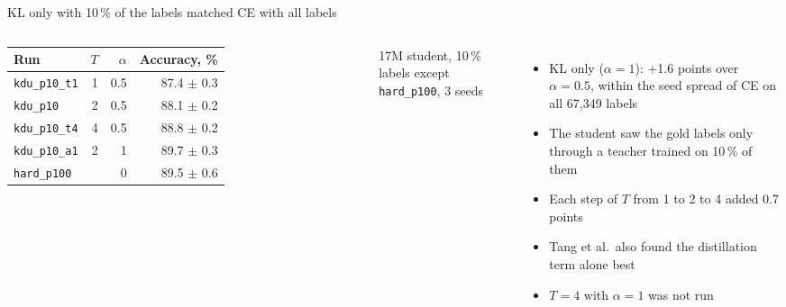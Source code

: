 \documentclass[aspectratio=169,11pt]{beamer}
\begin{document}
\begin{frame}{KL only with 10\,\% of the labels matched CE with all labels}
  \begin{columns}[T]
    \small
    \begin{tabular}{lrrr}
      \toprule
      Run & $T$ & $\alpha$ & Accuracy, \% \\
      \midrule
      \texttt{kdu\_p10\_t1} & 1 & 0.5 & 87.4 $\pm$ 0.3 \\
      \texttt{kdu\_p10} & 2 & 0.5 & 88.1 $\pm$ 0.2 \\
      \texttt{kdu\_p10\_t4} & 4 & 0.5 & 88.8 $\pm$ 0.2 \\
      \texttt{kdu\_p10\_a1} & 2 & 1 & 89.7 $\pm$ 0.3 \\
      \texttt{hard\_p100} & & 0 & 89.5 $\pm$ 0.6 \\
      \bottomrule
    \end{tabular}

    \footnotesize 17M student, 10\,\% labels except \texttt{hard\_p100}, 3 seeds
    \begin{itemize}
      \item KL only ($\alpha = 1$): +1.6 points over $\alpha = 0.5$, within the seed spread of CE on all 67,349 labels
      \item The student saw the gold labels only through a teacher trained on 10\,\% of them
      \item Each step of $T$ from 1 to 2 to 4 added 0.7 points
      \item Tang et al.\ also found the distillation term alone best
      \item $T = 4$ with $\alpha = 1$ was not run
    \end{itemize}
  \end{columns}
\end{frame}
\end{document}
